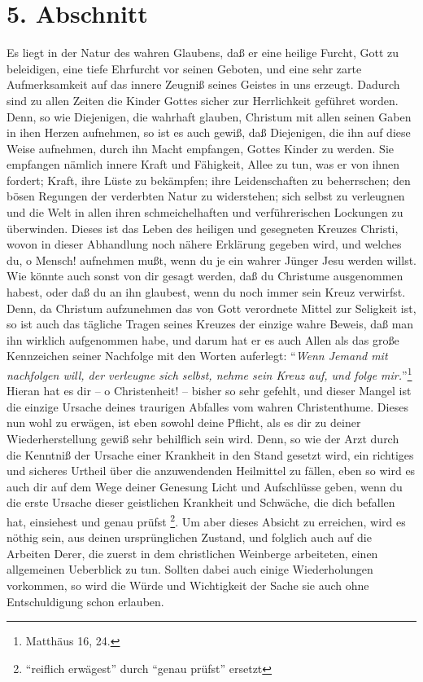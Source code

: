 \section{5. Abschnitt}

Es liegt in der Natur des wahren Glaubens, daß er eine heilige Furcht, Gott zu
beleidigen, eine tiefe Ehrfurcht vor seinen Geboten, und eine sehr zarte
Aufmerksamkeit auf das innere Zeugniß seines Geistes in uns erzeugt. Dadurch
sind zu allen Zeiten die Kinder Gottes sicher zur Herrlichkeit geführet worden.
Denn, so wie Diejenigen, die wahrhaft glauben, Christum mit allen seinen Gaben
in ihen Herzen aufnehmen, so ist es auch gewiß, daß Diejenigen, die ihn auf
diese Weise aufnehmen, durch ihn Macht empfangen, Gottes Kinder zu werden. Sie
empfangen nämlich innere Kraft und Fähigkeit, Allee zu tun, was er von ihnen
fordert; Kraft, ihre Lüste zu bekämpfen; ihre Leidenschaften zu beherrschen; den
bösen Regungen der verderbten Natur zu widerstehen; sich selbst zu verleugnen
und die Welt in allen ihren schmeichelhaften und verführerischen Lockungen zu
überwinden. Dieses ist das Leben des heiligen und gesegneten Kreuzes Christi,
wovon in dieser Abhandlung noch nähere Erklärung gegeben wird, und welches du, o
Mensch! aufnehmen mußt, wenn du je ein wahrer Jünger Jesu werden willst. Wie
könnte auch sonst von dir gesagt werden, daß du Christume ausgenommen habest,
oder daß du an ihn glaubest, wenn du noch immer sein Kreuz verwirfst. Denn, da
Christum aufzunehmen das von Gott verordnete Mittel zur Seligkeit ist, so ist
auch das tägliche Tragen seines Kreuzes der einzige wahre Beweis, daß man ihn
wirklich aufgenommen habe, und darum hat er es auch Allen als das große
Kennzeichen seiner Nachfolge mit den Worten auferlegt: "`\textit{Wenn Jemand mit
nachfolgen will, der verleugne sich selbst, nehme sein Kreuz auf, und folge
mir.}"'\footnote{Matthäus 16, 24.}
Hieran hat es dir -- o Christenheit! -- bisher so sehr gefehlt, und dieser
Mangel ist
die einzige Ursache deines traurigen Abfalles vom wahren Christenthume. Dieses
nun wohl zu erwägen, ist eben sowohl deine Pflicht, als es dir zu deiner
Wiederherstellung gewiß sehr behilflich sein wird. Denn, so wie der Arzt durch
die Kenntniß der Ursache einer Krankheit in den Stand gesetzt wird, ein
richtiges und sicheres Urtheil über die anzuwendenden Heilmittel zu fällen, eben
so wird es auch dir auf dem Wege deiner Genesung Licht und Aufschlüsse geben,
wenn du die erste Ursache dieser geistlichen Krankheit und Schwäche, die dich
befallen hat, einsiehest und genau prüfst \footnote{"`reiflich erwägest"' durch
"`genau prüfst"' ersetzt}. Um aber dieses Absicht zu
erreichen, wird es nöthig sein, aus deinen ursprünglichen Zustand, und folglich
auch auf die Arbeiten Derer, die zuerst in dem christlichen Weinberge
arbeiteten, einen allgemeinen Ueberblick zu tun. Sollten dabei auch einige
Wiederholungen vorkommen, so wird die Würde und Wichtigkeit der Sache sie auch
ohne Entschuldigung schon erlauben.

